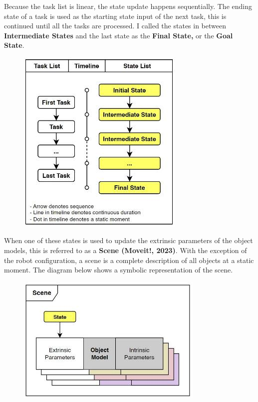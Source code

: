 \documentclass[11pt]{book}
\begin{document}
Because the task list is linear, the state update happens sequentially. The ending state of a task is used as the starting state input of the next task, this is continued until all the tasks are processed. I called the states in between \textbf{Intermediate States }and the last state as the \textbf{Final State, }or the \textbf{Goal State}.

\begin{figure}[H]
\includegraphics[width=8.01cm,height=8.99cm]{./images/image38.jpeg}
\end{figure}


When one of these states is used to update the extrinsic parameters of the object models, this is referred to as a \textbf{Scene \href{https://www.zotero.org/google-docs/?5iCzjM}{}(Moveit!, 2023)}. With the exception of the robot configuration, a scene is a complete description of all objects at a static moment. The diagram below shows a symbolic representation of the scene.

\begin{figure}[H]
\includegraphics[width=8.95cm,height=6.19cm]{./images/image39.jpeg}
\end{figure}
\end{document}
